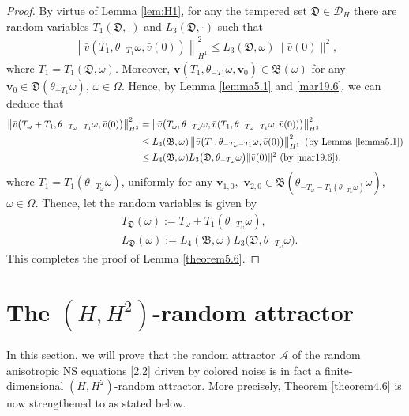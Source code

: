 \documentclass{elsarticle}
\theoremstyle{definition}
\numberwithin{equation}{section}
\newcommand{\D}{\mathcal{D}}
\newcommand{\B}{\mathfrak{B}}
\begin{document}
\begin{proof}
By virtue of Lemma \ref{lem:H1}, for any the tempered set   $\mathfrak D\in \D_H$ there are random variables $ T_1(\mathfrak D ,\cdot )  $ and $L_3(\mathfrak D,\cdot) $ such that
  \begin{align} \label{mar19.6}
  \left \| \bar v\left (T_1 ,\theta_{-T_1}\omega,  \bar v(0)\right)
  \right \|^2_{H^1}
 \leq L_3({\mathfrak D}, \omega) \|\bar {v} (0)\|^2  ,
  \end{align}
where $T_1= T_1(\mathfrak D, \omega)$. Moreover, $ \textbf{v}\left (T_1 ,\theta_{-T_1}\omega,  \textbf{v}_{0}\right) \in \mathfrak B(\omega)$ for any $\textbf{v}_0\in \mathfrak D(\theta_{-T_1}\omega) $, $\omega\in \Omega$.
Hence, by Lemma \ref{lemma5.1} and \eqref{mar19.6}, we can deduce that
 \begin{align*}
  \left \| \bar v \big( T_\omega +T_1, \theta_{-T_\omega-T_1}
 \omega, \bar v(0) \big)
   \right \|^2_{H^2}
 &  =  \left \| \bar v \big( T_\omega  , \theta_{-T_\omega }
 \omega, \bar v  ( T_1, \theta_{-T_\omega-T_1}
 \omega, \bar v(0)  )\big)
   \right \|^2_{H^2}  \\
   &\leq  L_4(\mathfrak B, \omega) \left \|  \bar v \big  ( T_1, \theta_{-T_\omega-T_1}
 \omega, \bar v(0)  \big)
   \right \|^2_{H^1}  \  \text{(by Lemma \ref{lemma5.1})}\\
   &\leq L_4(\mathfrak B,\omega)  L_3 \big (\mathfrak D, \theta_{-T_\omega}\omega \big) \|\bar v(0)\|^2  \  \text{(by \eqref{mar19.6})} ,
 \end{align*}
where $T_1=T_1(\theta_{-T_\omega}  \omega)$,
uniformly for any $\textbf{v}_{1,0},$ $ \textbf{v}_{2,0}\in \B(\theta_{-T_\omega-T_1(\theta_{-T_\omega} \omega)}\omega)$, $  \omega\in \Omega$. Thence,
let  the random variables is given by
 \begin{align*}
  & T_{\mathfrak D}( \omega) := T_\omega +T_1(\theta_{-T_\omega} \omega) , \\
  &L_{\mathfrak D}(\omega) :=  L_4(\mathfrak B,\omega)   L_3 \big (\mathfrak D, \theta_{-T_\omega}\omega \big).
 \end{align*}
This completes the proof of Lemma \ref{theorem5.6}.
  \end{proof}



\section{The $(H,H^2)$-random attractor}\label{sec6}
In this section,  we will prove that the  random attractor  $\mathcal A$ of the random anisotropic  NS equations \eqref{2.2} driven by colored noise is in fact a finite-dimensional  $(H,H^2)$-random attractor. More precisely, Theorem \ref{theorem4.6} is now strengthened to as stated below.
\end{document}
